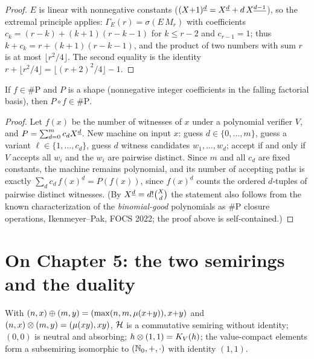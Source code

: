 \begin{proof}
$E$ is linear with nonnegative constants
($(X{+}1)^{\underline{d}}=X^{\underline{d}}+d\,X^{\underline{d-1}}$), so the extremal principle
applies: $\Gamma_E(r)=\sigma(E\,M_r)$ with coefficients
$c_k=(r{-}k)+(k{+}1)(r{-}k{-}1)$ for $k\le r{-}2$ and $c_{r-1}=1$;
thus $k+c_k=r+(k{+}1)(r{-}k{-}1)$, and the product of two numbers
with sum $r$ is at most $\lfloor r^2/4\rfloor$. The second
equality is the identity
$r+\lfloor r^2/4\rfloor=\lfloor(r{+}2)^2/4\rfloor-1$.
\end{proof}

\begin{satz}
If $f\in\#\mathrm P$ and $P$ is a shape (nonnegative integer
coefficients in the falling factorial basis), then
$P\circ f\in\#\mathrm P$.
\end{satz}

\begin{proof}
Let $f(x)$ be the number of witnesses of $x$ under a polynomial
verifier $V$, and $P=\sum_{d=0}^m c_dX^{\underline{d}}$. New machine on input
$x$: guess $d\in\{0,\ldots,m\}$, guess a variant
$\ell\in\{1,\ldots,c_d\}$, guess $d$ witness candidates
$w_1,\ldots,w_d$; accept if and only if $V$ accepts all $w_i$ and
the $w_i$ are pairwise distinct. Since $m$ and all $c_d$ are fixed
constants, the machine remains polynomial, and its number of
accepting paths is exactly
$\sum_d c_d\,f(x)^{\underline d}=P(f(x))$, since
$f(x)^{\underline d}$ counts the ordered $d$-tuples of pairwise
distinct witnesses. (By $X^{\underline{d}}=d!\binom Xd$ the statement also
follows from the known characterization of the
\emph{binomial-good} polynomials as \#P closure operations,
Ikenmeyer--Pak, FOCS 2022; the proof above is self-contained.)
\end{proof}

\section*{On Chapter 5: the two semirings and the duality}

\begin{satz}
With $(n,x)\oplus(m,y)=(\max(n,m,\mu(x{+}y)),x{+}y)$ and
$(n,x)\otimes(m,y)=(\mu(xy),xy)$, $\mathcal H$ is a commutative
semiring without identity; $(0,0)$ is neutral and absorbing;
$h\otimes(1,1)=K_V(h)$; the value-compact elements form a
subsemiring isomorphic to $(\mathbb N_0,+,\cdot)$ with identity $(1,1)$.
\end{satz}

